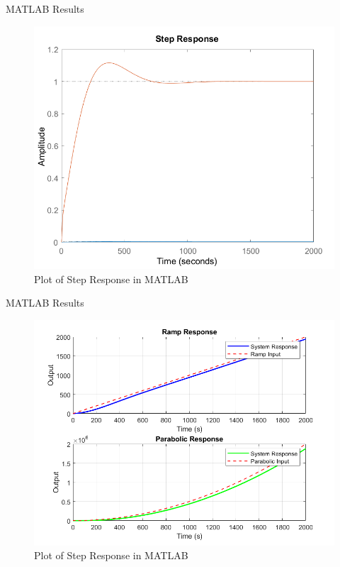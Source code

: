 \documentclass[10pt,compress,mathserif]{beamer}
\begin{document}
\begin{frame}{MATLAB Results}
\begin{figure}[h!]
	\centering
	\includegraphics[scale=0.6]{images/stepResponse_PID_MATLAB.png}
	\caption{Plot of Step Response in MATLAB}
\end{figure}
\end{frame}

\begin{frame}{MATLAB Results}
\begin{figure}[h!]
	\centering
	\includegraphics[scale=0.45]{images/rampparabolicResponse_PID_MATLAB.png}
	\caption{Plot of Step Response in MATLAB}
\end{figure}
\end{frame}
\end{document}
